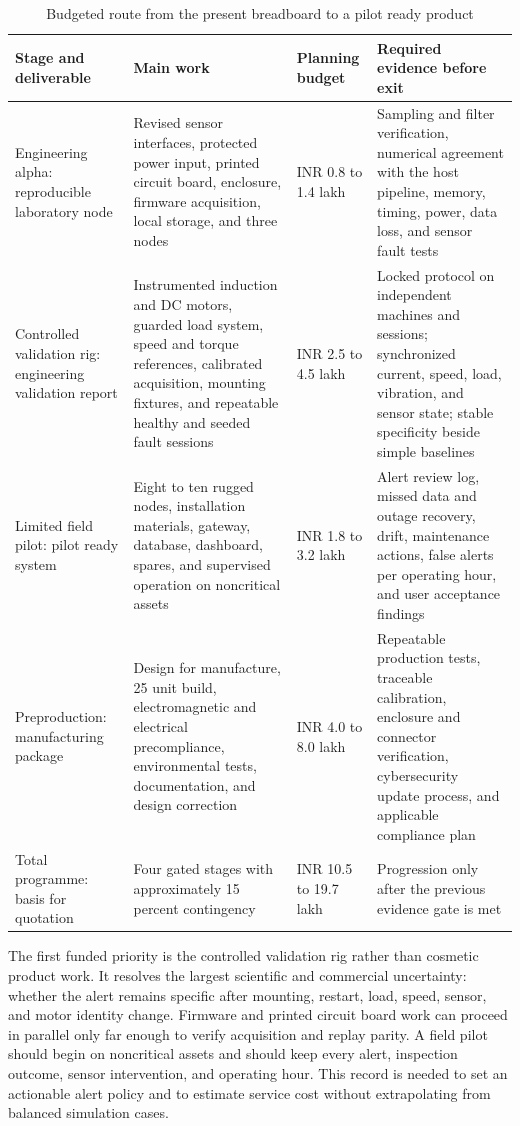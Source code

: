 \documentclass[10pt,twocolumn]{article}
\begin{document}
\begin{table}[t]
\caption{Budgeted route from the present breadboard to a pilot ready product}
\label{tab:roadmap}
\centering
\footnotesize
\begin{tabularx}{0.96\textwidth}{@{}p{}p{}p{}X@{}}
\toprule
Stage and deliverable & Main work & Planning budget & Required evidence before exit \\
\midrule
Engineering alpha: reproducible laboratory node & Revised sensor interfaces, protected power input, printed circuit board, enclosure, firmware acquisition, local storage, and three nodes & INR 0.8 to 1.4 lakh & Sampling and filter verification, numerical agreement with the host pipeline, memory, timing, power, data loss, and sensor fault tests \\
Controlled validation rig: engineering validation report & Instrumented induction and DC motors, guarded load system, speed and torque references, calibrated acquisition, mounting fixtures, and repeatable healthy and seeded fault sessions & INR 2.5 to 4.5 lakh & Locked protocol on independent machines and sessions; synchronized current, speed, load, vibration, and sensor state; stable specificity beside simple baselines \\
Limited field pilot: pilot ready system & Eight to ten rugged nodes, installation materials, gateway, database, dashboard, spares, and supervised operation on noncritical assets & INR 1.8 to 3.2 lakh & Alert review log, missed data and outage recovery, drift, maintenance actions, false alerts per operating hour, and user acceptance findings \\
Preproduction: manufacturing package & Design for manufacture, 25 unit build, electromagnetic and electrical precompliance, environmental tests, documentation, and design correction & INR 4.0 to 8.0 lakh & Repeatable production tests, traceable calibration, enclosure and connector verification, cybersecurity update process, and applicable compliance plan \\
\midrule
Total programme: basis for quotation & Four gated stages with approximately 15 percent contingency & INR 10.5 to 19.7 lakh & Progression only after the previous evidence gate is met \\
\bottomrule
\end{tabularx}
\end{table}

The first funded priority is the controlled validation rig rather than cosmetic product work. It resolves the largest scientific and commercial uncertainty: whether the alert remains specific after mounting, restart, load, speed, sensor, and motor identity change. Firmware and printed circuit board work can proceed in parallel only far enough to verify acquisition and replay parity. A field pilot should begin on noncritical assets and should keep every alert, inspection outcome, sensor intervention, and operating hour. This record is needed to set an actionable alert policy and to estimate service cost without extrapolating from balanced simulation cases.
\end{document}
